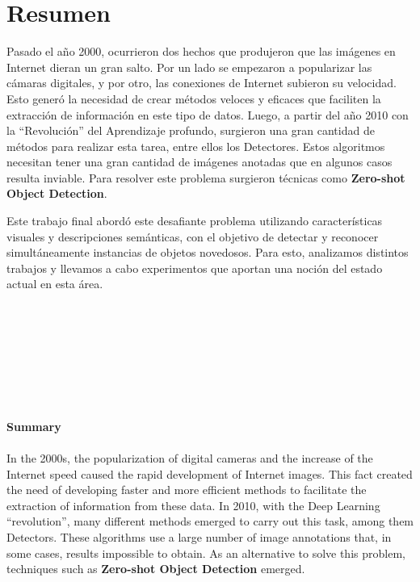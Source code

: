 \documentclass[12pt,twosided]{book}
\begin{document}
\chapter*{Resumen}

\pagestyle{plain}
Pasado el año 2000, ocurrieron dos hechos que produjeron que las imágenes en Internet dieran un gran salto. Por un lado se empezaron a popularizar las cámaras digitales, y por otro, las conexiones de Internet subieron su velocidad. Esto generó la necesidad de crear métodos veloces y eficaces que faciliten la extracción de información en este tipo de datos. Luego, a partir del año 2010 con la  ``Revolución'' del Aprendizaje profundo, surgieron una gran cantidad de métodos para realizar esta tarea, entre ellos los Detectores. Estos algoritmos necesitan tener una gran cantidad de imágenes anotadas que en algunos casos resulta inviable. Para resolver este problema surgieron técnicas como \textbf{Zero-shot Object Detection}. 

Este trabajo final abordó este desafiante problema utilizando características visuales y descripciones semánticas, con el objetivo de detectar y reconocer simultáneamente instancias de objetos novedosos. Para esto, analizamos distintos trabajos y llevamos a cabo experimentos que aportan una noción del estado actual en esta área. \\\\\\\\\\\\\\\\\\
{\huge\textbf{Summary}}\\\\

In the 2000s, the popularization of digital cameras and the increase of the Internet speed caused the rapid development of Internet images. This fact created the need of developing faster and more efficient methods to facilitate the extraction of information from these data. In 2010, with the Deep Learning ``revolution'', many different methods emerged to carry out this task, among them Detectors. These algorithms use a large number of image annotations that, in some cases, results impossible to obtain. As an alternative to solve this problem, techniques such as \textbf{Zero-shot Object Detection} emerged. 
\end{document}
